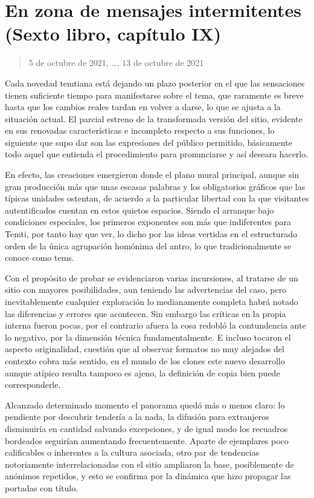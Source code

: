 \documentclass[
]{book}
\begin{document}
\hypertarget{en-zona-de-mensajes-intermitentes-sexto-libro-capuxedtulo-ix}{%
\section{En zona de mensajes intermitentes (Sexto libro, capítulo IX)}\label{en-zona-de-mensajes-intermitentes-sexto-libro-capuxedtulo-ix}}

\begin{quote}
5 de octubre de 2021, \ldots, 13 de octubre de 2021
\end{quote}

Cada novedad temtiana está dejando un plazo posterior en el que las sensaciones tienen suficiente tiempo para manifestarse sobre el tema, que raramente es breve hasta que los cambios reales tardan en volver a darse, lo que se ajusta a la situación actual. El parcial estreno de la transformada versión del sitio, evidente en sus renovadas características e incompleto respecto a sus funciones, lo siguiente que supo dar son las expresiones del público permitido, básicamente todo aquel que entienda el procedimiento para pronunciarse y así deseara hacerlo.

En efecto, las creaciones emergieron donde el plano mural principal, aunque sin gran producción más que unas escasas palabras y los obligatorios gráficos que las típicas unidades ostentan, de acuerdo a la particular libertad con la que visitantes autentificados cuentan en estos quietos espacios. Siendo el arranque bajo condiciones especiales, los primeros exponentes son más que indiferentes para Temti, por tanto hay que ver, lo dicho por las ideas vertidas en el estructurado orden de la única agrupación homónima del antro, lo que tradicionalmente se conoce como tems.

Con el propósito de probar se evidenciaron varias incursiones, al tratarse de un sitio con mayores posibilidades, aun teniendo las advertencias del caso, pero inevitablemente cualquier exploración lo medianamente completa habrá notado las diferencias y errores que acontecen. Sin embargo las críticas en la propia interna fueron pocas, por el contrario afuera la cosa redobló la contundencia ante lo negativo, por la dimensión técnica fundamentalmente. E incluso tocaron el aspecto originalidad, cuestión que al observar formatos no muy alejados del contexto cobra más sentido, en el mundo de los clones este nuevo desarrollo aunque atípico resulta tampoco es ajeno, la definición de copia bien puede corresponderle.

Alcanzado determinado momento el panorama quedó más o menos claro: lo pendiente por descubrir tendería a la nada, la difusión para extranjeros disminuiría en cantidad salvando excepciones, y de igual modo los recuadros bordeados seguirían aumentando frecuentemente. Aparte de ejemplares poco calificables o inherentes a la cultura asociada, otro par de tendencias notoriamente interrelacionadas con el sitio ampliaron la base, posiblemente de anónimos repetidos, y esto se confirma por la dinámica que hizo propagar las portadas con título.
\end{document}
